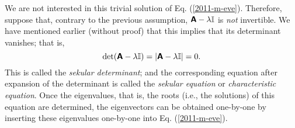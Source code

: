 We are not interested in this trivial solution of Eq. (\ref{2011-m-eve}).
Therefore, suppose that, contrary to the previous assumption,
$\textsf{\textbf{A}} - \lambda {\Bbb I}$ is {\em not} invertible.
We have mentioned earlier (without proof) that this implies that its determinant vanishes; that is,
\begin{equation}
\textrm{det} (\textsf{\textbf{A}} - \lambda {\Bbb I}) = \vert \textsf{\textbf{A}} - \lambda {\Bbb I}\vert =0.
\end{equation}
This is called the {\em sekular determinant};
and the corresponding equation after expansion of the determinant is called the
{\em sekular equation}
or {\em characteristic equation}.
Once the eigenvalues, that is, the roots (i.e., the solutions) of this equation are determined,
the eigenvectors can be obtained one-by-one by inserting these eigenvalues one-by-one into Eq. (\ref{2011-m-eve}).


